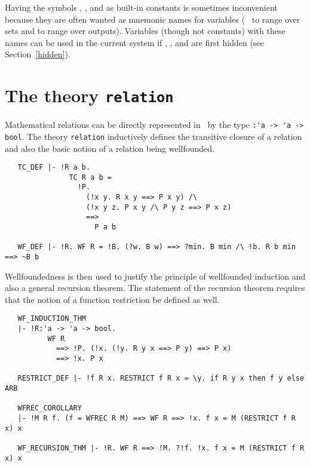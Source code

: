 Having the symbols , ,  and  as built-in
constants is sometimes inconvenient because they are often wanted as mnemonic
names for variables (\eg\  to range over sets and  to range over
outputs).  Variables
(though not constants) with these names can be used in the current system if
, ,  and  are first hidden (see Section~\ref{hidden}).
 

\section{The theory {\tt relation}}\label{relation}

Mathematical relations can be directly represented in \HOL\ by the type
{\small\verb+:'a -> 'a -> bool+}. The theory {\small\verb+relation+}
inductively defines the transitive closure of a relation and also the
basic notion of a relation being wellfounded.

\begin{hol} \begin{verbatim}
   TC_DEF |- !R a b.
               TC R a b =
                 !P.
                   (!x y. R x y ==> P x y) /\
                   (!x y z. P x y /\ P y z ==> P x z)
                   ==>
                     P a b

   WF_DEF |- !R. WF R = !B. (?w. B w) ==> ?min. B min /\ !b. R b min ==> ~B b
\end{verbatim}\end{hol}

Wellfoundedness is then used to justify the principle of wellfounded
induction and also a general recursion theorem. The statement of the
recursion theorem requires that the notion of a function restriction be
defined as well.

\begin{hol} \begin{verbatim}
   WF_INDUCTION_THM
   |- !R:'a -> 'a -> bool.
          WF R
            ==> !P. (!x. (!y. R y x ==> P y) ==> P x)
            ==> !x. P x

   RESTRICT_DEF |- !f R x. RESTRICT f R x = \y. if R y x then f y else ARB

   WFREC_COROLLARY
   |- !M R f. (f = WFREC R M) ==> WF R ==> !x. f x = M (RESTRICT f R x) x

   WF_RECURSION_THM |- !R. WF R ==> !M. ?!f. !x. f x = M (RESTRICT f R x) x

\end{verbatim}\end{hol}

